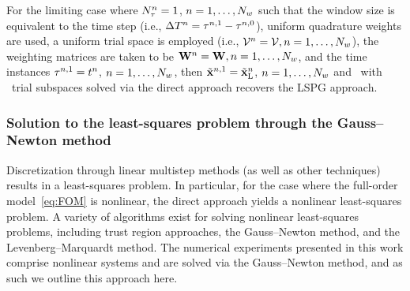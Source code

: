 \begin{remark}
For the limiting case where $N_{\tau}^{n} = 1$, $n=1,\ldots,N_w$ such that the window size is equivalent to the time step (i.e., $\Delta T^{n} = \tau^{n,1} - \tau^{n,0}$), uniform 
quadrature weights are used, a uniform trial space is employed (i.e., $\mathcal{V }^{n} = \mathcal{V }, n=1,\ldots,N_w$), the weighting matrices are taken to be
$\mathbf{W}^{n} = \mathbf{W}, n=1,\ldots,N_w$, and the time instances $\tau^{n,1} = t^n$, $n=1,\ldots,N_w$, then 
$\tilde{\mathbf{x}}^{n,1}  = \tilde{\mathbf{x}}_{\text{L}}^n$, $n=1,\ldots,N_w$ and  
\methodAcronym\ with \spatialAcronym\ trial
	subspaces solved via the direct approach recovers the LSPG approach. 
\end{remark} 
\subsubsection{Solution to the least-squares problem through the Gauss--Newton method}
Discretization through linear multistep methods (as well as other techniques) 
results in a least-squares problem. In particular, for the case where the full-order model~\eqref{eq:FOM} is nonlinear, the direct approach yields a nonlinear least-squares problem. 
A variety of algorithms exist for solving nonlinear least-squares problems, including trust region approaches, the Gauss–Newton method, and the Levenberg–Marquardt method. The numerical experiments presented in this work comprise nonlinear systems and are solved via the Gauss--Newton method, and as such we outline this approach here. 

